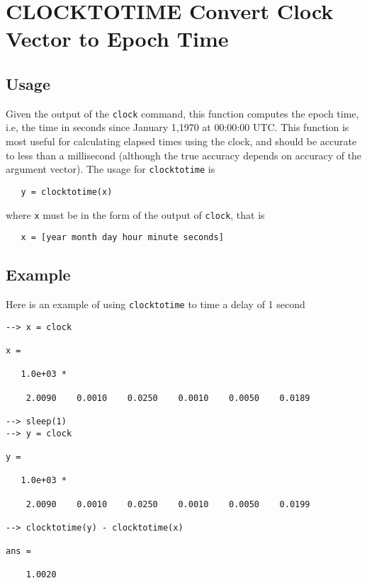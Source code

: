 \section{CLOCKTOTIME Convert Clock Vector to Epoch Time}

\subsection{Usage}

Given the output of the \verb|clock| command, this function computes
the epoch time, i.e, the time in seconds since January 1,1970 
at 00:00:00 UTC.  This function is most useful for calculating elapsed
times using the clock, and should be accurate to less than a millisecond
(although the true accuracy depends on accuracy of the argument vector). 
The usage for \verb|clocktotime| is
\begin{verbatim}
   y = clocktotime(x)
\end{verbatim}
where \verb|x| must be in the form of the output of \verb|clock|, that is
\begin{verbatim}
   x = [year month day hour minute seconds]
\end{verbatim}
\subsection{Example}

Here is an example of using \verb|clocktotime| to time a delay of 1 second
\begin{verbatim}
--> x = clock

x = 

   1.0e+03 * 

    2.0090    0.0010    0.0250    0.0010    0.0050    0.0189 

--> sleep(1)
--> y = clock

y = 

   1.0e+03 * 

    2.0090    0.0010    0.0250    0.0010    0.0050    0.0199 

--> clocktotime(y) - clocktotime(x)

ans = 

    1.0020 
\end{verbatim}
